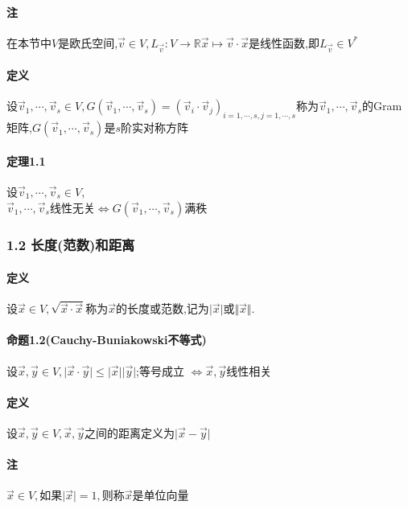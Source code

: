 \documentclass{ctexart}
\begin{document}
\paragraph{注}
在本节中$V$是欧氏空间,$\vec{v} \in V, L_{\vec{v}}:V \rightarrow \mathbb{R} \vec{x} \mapsto \vec{v}\cdot\vec{x}$是线性函数,即$L_{\vec{v}} \in V^{*}$

\paragraph{定义}
设$\vec{v}_{1},\cdots,\vec{v}_{s} \in V,G(\vec{v}_{1},\cdots,\vec{v}_{s})=(\vec{v}_{i}\cdot \vec{v}_{j})_{i=1,\cdots,s,j=1,\cdots,s}$称为$\vec{v}_{1},\cdots,\vec{v}_{s}$的Gram矩阵,$G(\vec{v}_{1},\cdots,\vec{v}_{s})$是$s$阶实对称方阵

\paragraph{定理1.1}
设$\vec{v}_{1},\cdots,\vec{v}_{s} \in V$,\\
$\vec{v}_{1},\cdots,\vec{v}_{s}$线性无关$\Leftrightarrow G(\vec{v}_{1},\cdots,\vec{v}_{s})$满秩

\subsubsection{1.2 长度(范数)和距离}

\paragraph{定义}
设$\vec{x} \in V, \sqrt{\vec{x}\cdot\vec{x}}$称为$\vec{x}$的长度或范数,记为$\vert \vec{x} \vert$或$\Vert \vec{x} \Vert$.

\paragraph{命题1.2(Cauchy-Buniakowski不等式)}

设$\vec{x},\vec{y} \in V,\vert \vec{x}\cdot \vec{y} \vert \le \vert \vec{x} \vert \vert \vec{y} \vert$;等号成立 $ \Leftrightarrow \vec{x},\vec{y}$线性相关

\paragraph{定义}
设$\vec{x},\vec{y} \in V,\vec{x},\vec{y}$之间的距离定义为$\vert \vec{x}-\vec{y} \vert$

\paragraph{注}
$\vec{x} \in V,$如果$\vert \vec{x}\vert = 1,$则称$\vec{x}$是单位向量
\end{document}
